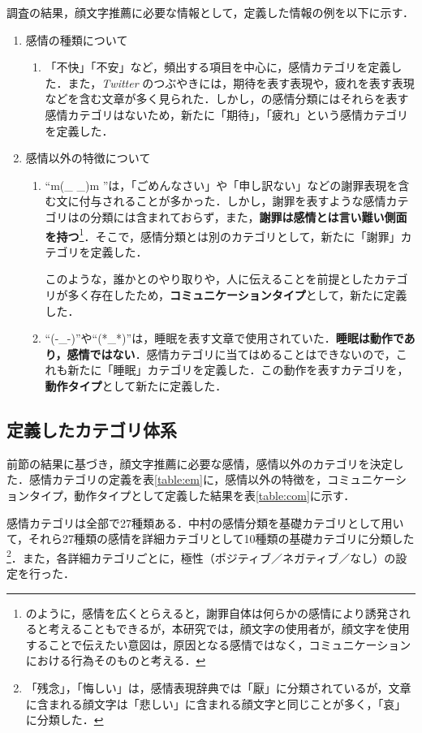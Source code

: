 \documentclass[japanese]{jnlp_1.4}
\begin{document}
調査の結果，顔文字推薦に必要な情報として，定義した情報の例を以下に示す．

\begin{enumerate}
\item 感情の種類について
\begin{enumerate}
\item 「不快」「不安」など，頻出する項目を中心に，感情カテゴリを定義した．また，{\it Twitter} のつぶやきには，期待を表す表現や，疲れを表す表現などを含む文章が多く見られた．しかし，の感情分類にはそれらを表す感情カテゴリはないため，新たに「期待」，「疲れ」という感情カテゴリを定義した．
\end{enumerate}
\item 感情以外の特徴について
\begin{enumerate}
\item ``m(\_ \_)m ''は，「ごめんなさい」や「申し訳ない」などの謝罪表現を含む文に付与されることが多かった．しかし，謝罪を表すような感情カテゴリはの分類には含まれておらず，また，{\bf 謝罪は感情とは言い難い側面を持つ}\footnote{のように，感情を広くとらえると，謝罪自体は何らかの感情により誘発されると考えることもできるが，本研究では，顔文字の使用者が，顔文字を使用することで伝えたい意図は，原因となる感情ではなく，コミュニケーションにおける行為そのものと考える．}．そこで，感情分類とは別のカテゴリとして，新たに「謝罪」カテゴリを定義した．

このような，誰かとのやり取りや，人に伝えることを前提としたカテゴリが多く存在したため，{\bf コミュニケーションタイプ}として，新たに定義した．
\item ``(-\_-)''や``(*\_*)''は，睡眠を表す文章で使用されていた．{\bf 睡眠は動作であり，感情ではない}．感情カテゴリに当てはめることはできないので，これも新たに「睡眠」カテゴリを定義した．この動作を表すカテゴリを，{\bf 動作タイプ}として新たに定義した．
\end{enumerate}
\end{enumerate}



\subsection{定義したカテゴリ体系}

前節の結果に基づき，顔文字推薦に必要な感情，感情以外のカテゴリを決定した．感情カテゴリの定義を表\ref{table:em}に，感情以外の特徴を，コミュニケーションタイプ，動作タイプとして定義した結果を表\ref{table:com}に示す．

感情カテゴリは全部で27種類ある．中村の感情分類を基礎カテゴリとして用いて，それら27種類の感情を詳細カテゴリとして10種類の基礎カテゴリに分類した\footnote{「残念」，「悔しい」は，感情表現辞典\cite{naka}では「厭」に分類されているが，文章に含まれる顔文字は「悲しい」に含まれる顔文字と同じことが多く，「哀」に分類した．}．また，各詳細カテゴリごとに，極性（ポジティブ／ネガティブ／なし）の設定を行った．
\end{document}
